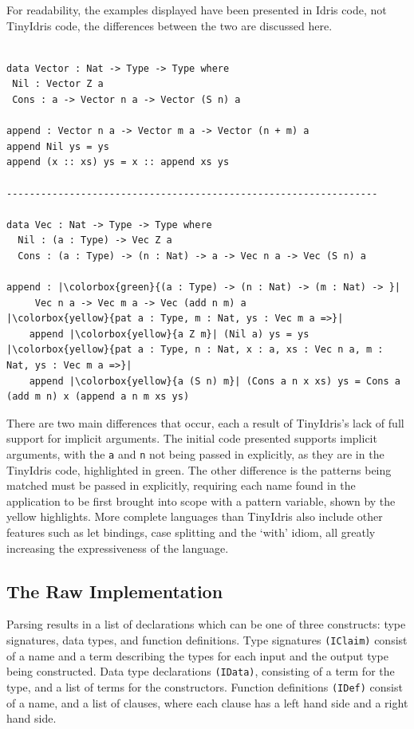 \documentclass[a4paper]{article}
\begin{document}
For readability, the examples displayed have been presented in Idris code, not
TinyIdris code, the differences between the two are discussed here. 

\begin{center}
\begin{verbatim}

data Vector : Nat -> Type -> Type where
 Nil : Vector Z a
 Cons : a -> Vector n a -> Vector (S n) a

append : Vector n a -> Vector m a -> Vector (n + m) a
append Nil ys = ys
append (x :: xs) ys = x :: append xs ys

-----------------------------------------------------------------

data Vec : Nat -> Type -> Type where
  Nil : (a : Type) -> Vec Z a
  Cons : (a : Type) -> (n : Nat) -> a -> Vec n a -> Vec (S n) a

append : |\colorbox{green}{(a : Type) -> (n : Nat) -> (m : Nat) -> }|
	 Vec n a -> Vec m a -> Vec (add n m) a
|\colorbox{yellow}{pat a : Type, m : Nat, ys : Vec m a =>}|
	append |\colorbox{yellow}{a Z m}| (Nil a) ys = ys
|\colorbox{yellow}{pat a : Type, n : Nat, x : a, xs : Vec n a, m : Nat, ys : Vec m a =>}|
	append |\colorbox{yellow}{a (S n) m}| (Cons a n x xs) ys = Cons a (add m n) x (append a n m xs ys)
\end{verbatim}
\end{center}

There are two main differences that occur, each a result of TinyIdris's lack of full
support for implicit arguments. The initial code presented supports
implicit arguments, with the \texttt{a} and \texttt{n} not being passed in explicitly,
as they are in the TinyIdris code, highlighted in green. The other difference is the patterns
being matched must be passed in explicitly, requiring each name found 
in the application to be first brought into scope with a pattern 
variable, shown by the yellow highlights. More complete languages than TinyIdris also include
other features such as let bindings, case splitting and the `with' idiom, all greatly increasing the
expressiveness of the language.

\subsection{The Raw Implementation}
\label{sec:orgbff7c18}
Parsing results in a list of declarations which can be one of three constructs: type signatures, data types, and function definitions.
Type signatures \texttt{(IClaim)} consist of a name and a term describing the types for each input and the output
type being constructed. Data type 
declarations \texttt{(IData)}, consisting of a term for the type, and a list of
terms for the constructors. Function definitions \texttt{(IDef)} consist of a
name, and a list of clauses, where each clause has a left hand side and
a right hand side. 
\end{document}

